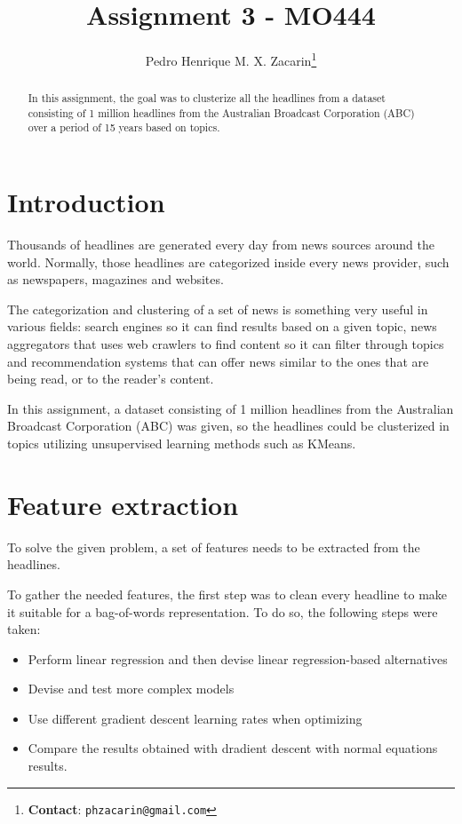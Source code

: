 \documentclass[10pt,twocolumn,letterpaper]{article}
\begin{document}
\title{Assignment 3 - MO444}
\author{Pedro Henrique M. X. Zacarin\thanks{\textbf{Contact}: \tt\small{phzacarin@gmail.com}}\\
}

\maketitle
\begin{abstract}
In this assignment, the goal was to clusterize all the headlines from a dataset consisting of 1 million headlines from the Australian Broadcast Corporation (ABC) over a period of 15 years based on topics.
\end{abstract}

\section{Introduction}
Thousands of headlines are generated every day from news sources around the world. Normally, those headlines are categorized inside every news provider, such as newspapers, magazines and websites.

The categorization and clustering of a set of news is something very useful in various fields: search engines so it can find results based on a given topic, news aggregators that uses web crawlers to find content so it can filter through topics and recommendation systems that can offer news similar to the ones that are being read, or to the reader's content.

In this assignment, a dataset consisting of 1 million headlines from the Australian Broadcast Corporation (ABC) was given, so the headlines could be clusterized in topics utilizing unsupervised learning methods such as KMeans.

\section{Feature extraction}
To solve the given problem, a set of features needs to be extracted from the headlines.

To gather the needed features, the first step was to clean every headline to make it suitable for a bag-of-words representation. To do so, the following steps were taken:
\begin{itemize}
	\item Perform linear regression and then devise linear regression-based alternatives
	\item Devise and test more complex models
	\item Use different gradient descent learning rates when optimizing
	\item Compare the results obtained with dradient descent with normal equations results.
\end{itemize}
\end{document}
